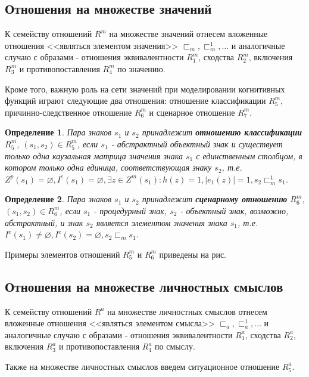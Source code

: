 \documentclass[12pt]{scrartcl}
\newtheorem{definition}{Определение}
\begin{document}
	\subsection{Отношения на множестве значений}	
	
	К семейству отношений $R^m$ на множестве значений отнесем вложенные отношения <<являться элементом значения>> ${\sqsubset_m,\sqsubset_m^1,\dots}$ и аналогичные случаю с образами - отношения эквивалентности $R_1^m$, сходства $R_2^m$, включения $R_3^m$ и противопоставления $R_4^m$ по значению.
	
	Кроме того, важную роль на сети значений при моделировании когнитивных функций играют следующие два отношения: отношение классификации $R_5^m$, причинно-следственное отношение $R_6^m$ и сценарное отношение $R_7^m$.
	
	\begin{definition}
		Пара знаков $s_1$ и $s_2$ принадлежит \textbf{отношению классификации} $R_5^m$, $(s_1,s_2)\in R_5^m$, если $s_1$ - абстрактный объектный знак и существует только одна каузальная матрица значения знака $s_1$ с единственным столбцом, в котором только одна единица, соответствующая знаку $s_2$, т.е. $Z^p(s_1)=\varnothing, I^e(s_1)=\varnothing, \exists z\in Z^m(s_1): h(z)=1, |e_1(z)|=1, s_2\sqsubset_m^1 s_1$.
	\end{definition}
	
	\begin{definition}
		Пара знаков $s_1$ и $s_2$ принадлежит \textbf{сценарному отношению} $R_6^m$, $(s_1,s_2)\in R_6^m$, если $s_1$ - процедурный знак, $s_2$ - объектный знак, возможно, абстрактный, и знак $s_2$ является элементом значения знака $s_1$, т.е. $I^e(s_1)\not = \varnothing, I^e(s_2) = \varnothing, s_2\sqsubset_m s_1$.
	\end{definition}
	
	Примеры элементов отношений $R_5^m$ и $R_6^m$ приведены на рис.
	
	\subsection{Отношения на множестве личностных смыслов}	
	К семейству отношений $R^a$ на множестве личностных смыслов отнесем вложенные отношения <<являться элементом смысла>> ${\sqsubset_a,\sqsubset_a^1,\dots}$ и аналогичные случаю с образами - отношения эквивалентности $R_1^a$, сходства $R_2^a$, включения $R_3^a$ и противопоставления $R_4^a$ по смыслу.
	
	Также на множестве личностных смыслов введем ситуационное отношение $R_5^a$.
	
\end{document}
